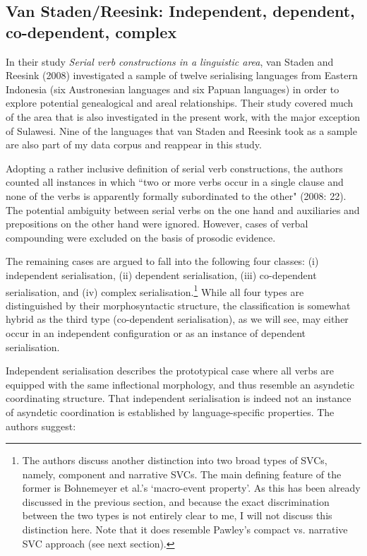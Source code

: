 \subsection[Van Staden/Reesink: Independent, dependent, ...]{Van Staden/Reesink: Independent, dependent, co-dependent, complex%
}

In their study \textit{Serial verb constructions in a linguistic area}, van Staden and Reesink (2008) investigated a sample of twelve serialising languages from Eastern Indonesia (six Austronesian languages and six Papuan languages) in order to explore potential genealogical and areal relationships. Their study covered much of the area that is also investigated in the present work, with the major exception of Sulawesi. Nine of the languages that van Staden and Reesink took as a sample are also part of my data corpus and reappear in this study. 

Adopting a rather inclusive definition of serial verb constructions, the authors counted all instances in which ``two or more verbs occur in a single clause and none of the verbs is apparently formally subordinated to the other" (2008: 22). The potential ambiguity between serial verbs on the one hand and auxiliaries and prepositions on the other hand were ignored. However, cases of verbal compounding were excluded on the basis of prosodic evidence. 

The remaining cases are argued to fall into the following four classes: (i) independent serialisation, (ii) dependent serialisation, (iii) co-dependent serialisation, and (iv) complex serialisation.\footnote{The authors discuss another distinction into two broad types of SVCs, namely, component and narrative SVCs. The main defining feature of the former is Bohnemeyer et al.'s `macro-event property'. As this has been already discussed in the previous section, and because the exact discrimination between the two types is not entirely clear to me, I will not discuss this distinction here. Note that it does resemble Pawley's compact vs. narrative SVC approach (see next section).} While all four types are distinguished by their morphosyntactic structure, the classification is somewhat hybrid as the third type (co-dependent serialisation), as we will see, may either occur in an independent configuration or as an instance of dependent serialisation.

Independent serialisation describes the prototypical case where all verbs are equipped with the same inflectional morphology, and thus resemble an asyndetic coordinating structure. That independent serialisation is indeed not an instance of asyndetic coordination is established by language-specific properties. The authors suggest:

